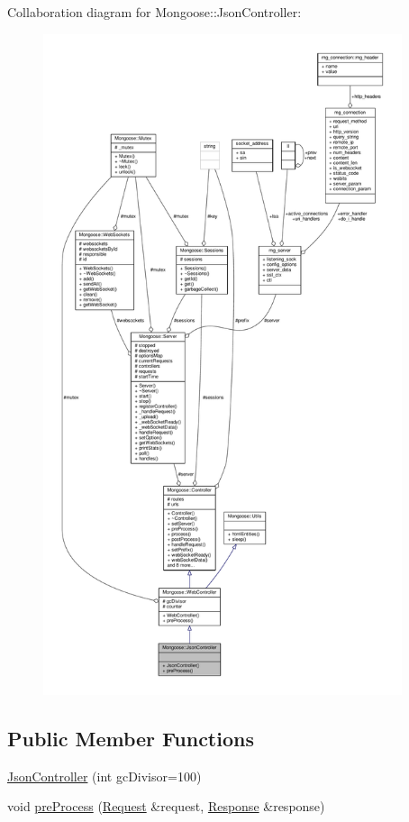 Collaboration diagram for Mongoose\+:\+:Json\+Controller\+:
\nopagebreak
\begin{figure}[H]
\begin{center}
\leavevmode
\includegraphics[height=550pt]{d4/dfb/classMongoose_1_1JsonController__coll__graph}
\end{center}
\end{figure}
\subsection*{Public Member Functions}
\begin{DoxyCompactItemize}
\item 
\hyperlink{classMongoose_1_1JsonController_a8fbcabba350e55a50d14a4d6da04a48e}{Json\+Controller} (int gc\+Divisor=100)
\item 
void \hyperlink{classMongoose_1_1JsonController_abb2ee896c92e8bb885aabc4bbec56be7}{pre\+Process} (\hyperlink{classMongoose_1_1Request}{Request} \&request, \hyperlink{classMongoose_1_1Response}{Response} \&response)
\end{DoxyCompactItemize}
